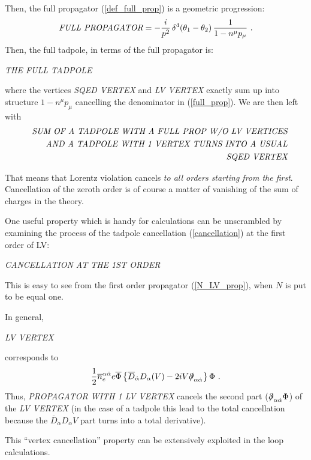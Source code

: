 \documentclass[a4paper,12pt]{article}
\newcommand{\slashed}[1]{\hbox{{$#1$}\llap{$/$}}}
\begin{document}
	Then, the full propagator (\ref{def_full_prop}) is a 
	geometric progression: 
\begin{equation}
\label{full_prop}
	\emph{FULL PROPAGATOR} = - \frac{i}{p^2}\,
		\delta^4 (\theta_1 - \theta_2)\,
		\frac{1}
	           {1 - n^\mu p_\mu}
	~.
\end{equation}
	Then, the full tadpole, in terms of the full propagator is:

\emph{THE FULL TADPOLE}

	where the vertices
\emph{SQED VERTEX}
	and
\emph{LV VERTEX}
	exactly sum up into structure 
$ 1 - n^\mu p_\mu $
	cancelling the denominator in (\ref{full_prop}).
	We are then left with
\begin{eqnarray}
\nonumber
&& \emph{SUM OF A TADPOLE WITH A FULL PROP W/O LV VERTICES} \\
\label{cancellation}
&& \emph{AND A TADPOLE WITH 1 VERTEX TURNS INTO A USUAL} \\
\nonumber
&& \emph{SQED VERTEX}
\end{eqnarray}

	That means that Lorentz violation cancels
	{\it to all orders starting from the first}.
	Cancellation of the zeroth order is of course
	a matter of vanishing of the sum of charges 
	in the theory.

	One useful property which is handy for calculations
	can be unscrambled by examining the process of the
	tadpole cancellation (\ref{cancellation}) at the first 
	order of LV:

\emph{CANCELLATION AT THE 1ST ORDER}

	This is easy to see from the first order propagator
	(\ref{N_LV_prop}), when $ N $ is put to be equal one.

	In general, 

\emph{LV VERTEX}
	
	corresponds to
\[
	\frac{1}{2} \overline{n}_e^{\alpha\dot\alpha}
	e \overline{\Phi}
	\left\{
		\overline{D}_{\dot\alpha} D_\alpha ( V )
		- 
		2 i V \slashed{\partial}_{\alpha\dot\alpha}
	\right\} \Phi
	~.
\] 
	Thus, 
\emph{PROPAGATOR WITH 1 LV VERTEX}
	cancels the second part
	($ \slashed{\partial}_{\alpha\dot\alpha} \Phi $)
	of the
\emph{LV VERTEX}
	(in the case of a tadpole this lead to the total 
	cancellation because the 
	$ \overline{D}_{\dot\alpha} D_\alpha V $
	part turns into a total derivative).

	This ``vertex cancellation'' property can be extensively
	exploited in the loop calculations.
\end{document}
